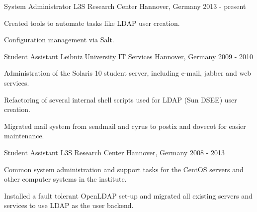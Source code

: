 

\begin{cventries}

  \cventry
    {System Administrator} %
    {L3S Research Center} %
    {Hannover, Germany} %
    {2013 - present} %
    {
      \begin{cvitems} %
        \item {Created tools to automate tasks like LDAP user creation.}
        \item {Configuration management via Salt.}
      \end{cvitems}
    }

  \cventry
    {Student Assistant} %
    {Leibniz University IT Services} %
    {Hannover, Germany} %
    {2009 - 2010} %
    {
      \begin{cvitems} %
        \item {Administration of the Solaris 10 student server, including e-mail, jabber and web services.}
	\item {Refactoring of several internal shell scripts used for LDAP (Sun DSEE) user creation.}
	\item {Migrated mail system from sendmail and cyrus to postix and dovecot for easier maintenance.}
      \end{cvitems} 
    }
    
  \cventry
    {Student Assistant} %
    {L3S Research Center} %
    {Hannover, Germany} %
    {2008 - 2013} %
    {
      \begin{cvitems} %
	\item {Common system administration and support tasks for the CentOS servers and other computer systems in the institute.}
        \item {Installed a fault tolerant OpenLDAP set-up and migrated all existing servers and services to use LDAP as the user backend.}
      \end{cvitems}
    }

\end{cventries}
